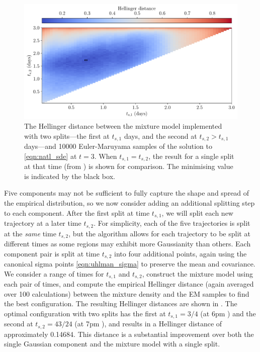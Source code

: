 \begin{figure}
	\centering
	\includegraphics[width=\textwidth]{chp06_applications/figures/gulf_stream/hell_dist_2split}
	\caption{The Hellinger distance between the mixture model implemented with two splits---the first at \(t_{s,1}\) days, and the second at \(t_{s,2} > t_{s,1}\) days---and 10000 Euler-Maruyama samples of the solution to \cref{eqn:natl_sde} at \(t = 3\).
		When \(t_{s,1} = t_{s,2}\), the result for a single split at that time (from ) is shown for comparison.
		The minimising value is indicated by the black box.}
	\label{fig:na_2split_hell}
\end{figure}


Five components may not be sufficient to fully capture the shape and spread of the empirical distribution, so we now consider adding an additional splitting step to each component.
After the first split at time \(t_{s,1}\), we will split each new trajectory at a later time \(t_{s,2}\).
For simplicity, each of the five trajectories is split at the \emph{same} time \(t_{s,2}\), but the algorithm allows for each trajectory to be split at different times as some regions may exhibit more Gaussianity than others.
Each component pair is split at time \(t_{s,2}\) into four additional points, again using the canonical sigma points \cref{eqn:uhlman_sigma} to preserve the mean and covariance.
We consider a range of times for \(t_{s,1}\) and \(t_{s,2}\), construct the mixture model using each pair of times, and compute the empirical Hellinger distance (again averaged over 100 calculations) between the mixture density and the EM samples to find the best configuration.
The resulting Hellinger distances are shown in .
The optimal configuration with two splits has the first at \(t_{s,1} = 3/4\) (at 6pm ) and the second at \(t_{s,2} = 43/24\) (at 7pm ), and results in a Hellinger distance of approximately 0.14684.
This distance is a substantial improvement over both the single Gaussian component and the mixture model with a single split.

